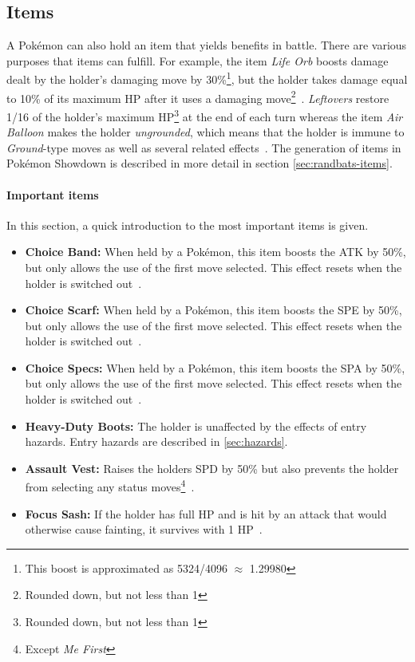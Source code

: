 \subsection{Items}
\label{sec:items}
A Pokémon can also hold an item that yields benefits in battle. There are various purposes that items 
can fulfill. For example, the item \textit{Life Orb} boosts damage dealt by the holder's damaging move
by 30\%\footnote{This boost is approximated as 5324/4096 $\approx$ 1.29980}, but the holder takes
damage equal to 10\% of its maximum \ac{HP} after it uses a damaging move\footnote{Rounded down, 
but not less than 1}~\autocite{Bulbapedia:LifeOrb}. \textit{Leftovers} restore 1/16 of the holder's
maximum \ac{HP}\footnote{Rounded down, but not less than 1} at the end of each turn whereas the item
\textit{Air Balloon} makes the holder \textit{ungrounded}, which means that the holder is immune to
\textit{Ground}-type moves as well as several related effects~\autocite{Bulbapedia:AirBalloon}. The 
generation of items in Pokémon Showdown is described in more detail in section \ref{sec:randbats-items}.
\paragraph{Important items}
\label{sec:Important-items}
In this section, a quick introduction to the most important items is given.
\begin{itemize}
	\item \textbf{Choice Band:} When held by a Pokémon, this item boosts the \ac{ATK} by 50\%, but only
	allows the use of the first move selected. This effect resets when the holder is switched out~\autocite{Bulbapedia:ChoiceBand}. 
	\item \textbf{Choice Scarf:} When held by a Pokémon, this item boosts the \ac{SPE} by 50\%, but only
	allows the use of the first move selected. This effect resets when the holder is switched out~\autocite{Bulbapedia:ChoiceScarf}. 
	\item \textbf{Choice Specs:} When held by a Pokémon, this item boosts the \ac{SPA} by 50\%, but only
	allows the use of the first move selected. This effect resets when the holder is switched out~\autocite{Bulbapedia:ChoiceSpecs}. 
	\item \textbf{Heavy-Duty Boots:} The holder is unaffected by the effects of entry hazards. Entry hazards are described 
	in \ref{sec:hazards}.
	\item \textbf{Assault Vest:} Raises the holders \ac{SPD} by 50\% but also prevents the holder from selecting any 
	status moves\footnote{Except \textit{Me First}}~\autocite{Bulbapedia:AssaultVest}.
	\item \textbf{Focus Sash:} If the holder has full \ac{HP} and is hit by an attack that would otherwise cause fainting,
	it survives with 1 \ac{HP}~\autocite{Bulbapedia:FocusSash}.
\end{itemize}

